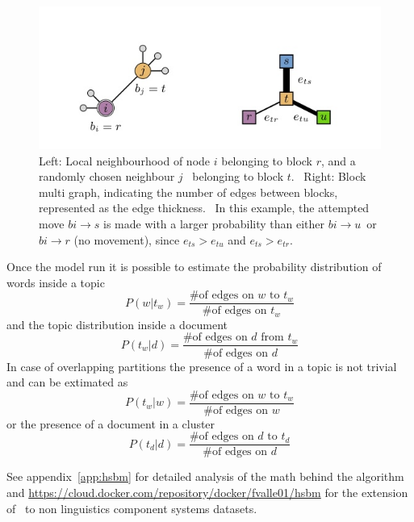 \begin{figure}[htb!]
  \centering
  \includegraphics[width=0.9\linewidth]{pictures/topic/peixioto_move.jpg}
  \caption{Left: Local neighbourhood of node $i$ belonging to block $r$, and a randomly chosen neighbour $j$ \
  belonging to block $t$. \
  Right: Block multi graph, indicating the number of edges between blocks, represented as the edge thickness. \
  In this example, the attempted move $bi \to s$ is made with a larger probability than either $bi \to u$\
   or $bi \to r$ (no movement), since $e_{ts}>e_{tu}$ and $e_{ts}>e_{tr}$.}
  \label{fig:topic_pixioto_move}
\end{figure}

Once the model run it is possible to estimate the probability distribution of words inside a topic
\[P(w|t_w)=\frac{\text{\# of edges on $w$ to $t_w$}}{\text{\# of edges on $t_w$}}\]
and the topic distribution inside a document
\[P(t_w|d)=\frac{\text{\# of edges on $d$ from $t_w$}}{\text{\# of edges on $d$}}\]
In case of overlapping partitions the presence of a word in a topic is not trivial and can be extimated as 
\[P(t_w|w)=\frac{\text{\# of edges on $w$ to $t_w$}}{\text{\# of edges on $w$}}\]
or the presence of a document in a cluster
\[P(t_d|d)=\frac{\text{\# of edges on $d$ to $t_d$}}{\text{\# of edges on $d$}}\]

See appendix~\ref{app:hsbm} for detailed analysis of the math behind the algorithm and \url{https://cloud.docker.com/repository/docker/fvalle01/hsbm} for the extension of~\cite{gerlach2018network} to non linguistics component systems datasets.